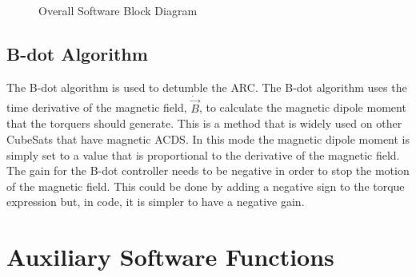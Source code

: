 \begin{figure}[H]
    \centering
    \caption{Overall Software Block Diagram}
    \label{fig:swblock}
\end{figure}

\subsection{B-dot Algorithm}

\label{sec:bdot-desc}

The B-dot algorithm is used to detumble the \ac{ARC}. The B-dot algorithm uses the time derivative of the magnetic field, $\dot{\vec{B}}$, to calculate the magnetic dipole moment that the torquers should generate. This is a method that is widely used on other CubeSats  that have magnetic \ac{ACDS}. In this mode the magnetic dipole moment is simply set to a value that is proportional to the derivative of the magnetic field. The gain for the B-dot controller needs to be negative in order to stop the motion of the magnetic field. This could be done by adding a negative sign to the torque expression but, in code, it is simpler to have a negative gain.

\section{Auxiliary Software Functions}

